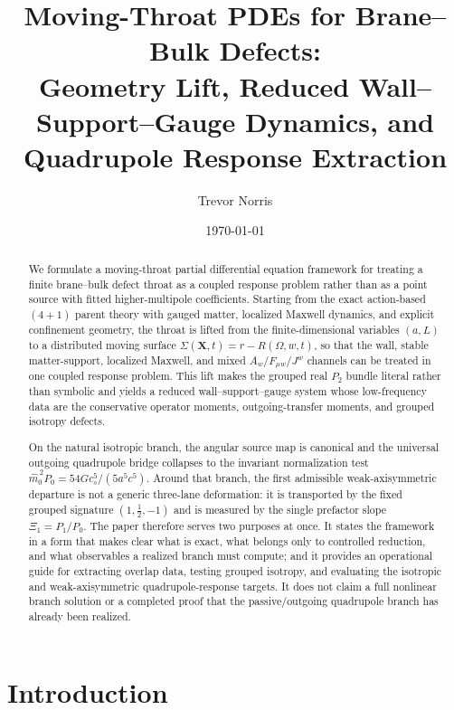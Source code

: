 \documentclass[11pt]{article}
\title{Moving-Throat PDEs for Brane--Bulk Defects:\\
Geometry Lift, Reduced Wall--Support--Gauge Dynamics, and Quadrupole Response Extraction}
\author{Trevor Norris}
\date{\today}
\theoremstyle{definition}
\begin{document}
\maketitle

\begin{abstract}
We formulate a moving-throat partial differential equation framework for treating a finite brane--bulk defect throat as a coupled response problem rather than as a point source with fitted higher-multipole coefficients. Starting from the exact action-based $(4+1)$ parent theory with gauged matter, localized Maxwell dynamics, and explicit confinement geometry, the throat is lifted from the finite-dimensional variables $(a,L)$ to a distributed moving surface $\Sigma(\mathbf X,t)=r-R(\Omega,w,t)$, so that the wall, stable matter-support, localized Maxwell, and mixed $A_w/F_{\mu w}/J^w$ channels can be treated in one coupled response problem. This lift makes the grouped real $P_2$ bundle literal rather than symbolic and yields a reduced wall--support--gauge system whose low-frequency data are the conservative operator moments, outgoing-transfer moments, and grouped isotropy defects.

On the natural isotropic branch, the angular source map is canonical and the universal outgoing quadrupole bridge collapses to the invariant normalization test $\hat m_0^{\,2}P_0=54Gc_s^5/(5a^5c^5)$. Around that branch, the first admissible weak-axisymmetric departure is not a generic three-lane deformation: it is transported by the fixed grouped signature $(1,\tfrac12,-1)$ and is measured by the single prefactor slope $\Xi_1=P_1/P_0$. The paper therefore serves two purposes at once. It states the framework in a form that makes clear what is exact, what belongs only to controlled reduction, and what observables a realized branch must compute; and it provides an operational guide for extracting overlap data, testing grouped isotropy, and evaluating the isotropic and weak-axisymmetric quadrupole-response targets. It does not claim a full nonlinear branch solution or a completed proof that the passive/outgoing quadrupole branch has already been realized.
\end{abstract}

\section{Introduction}
\label{sec:introduction}
\end{document}
